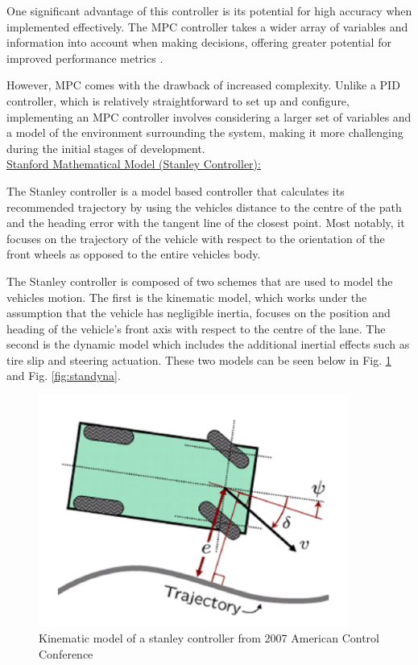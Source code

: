 \documentclass[titlepage,draft]{article}
\begin{document}
{One significant advantage of this controller is its potential for high accuracy when implemented effectively. The MPC controller takes a wider array of variables and information into account when making decisions, offering greater potential for improved performance metrics \cite{GARCIA1989335}.

However, MPC comes with the drawback of increased complexity. Unlike a PID controller, which is relatively straightforward to set up and configure, implementing an MPC controller involves considering a larger set of variables and a model of the environment surrounding the system, making it more challenging during the initial stages of development.
\\

\underline{Stanford Mathematical Model (Stanley Controller):}

The Stanley controller is a model based controller that calculates its recommended trajectory by using the vehicles distance to the centre of the path and the heading error with the tangent line of the closest point. Most notably, it focuses on the trajectory of the vehicle with respect to the orientation of the front wheels as opposed to the entire vehicles body\cite{4282788}.

The Stanley controller is composed of two schemes that are used to model the vehicles motion. The first is the kinematic model, which works under the assumption that the vehicle has negligible inertia, focuses on the position and heading of the vehicle's front axis with respect to the centre of the lane. The second is the dynamic model which includes the additional inertial effects such as tire slip and steering actuation. These two models can be seen below in Fig. \ref{fig:stankine} and Fig. \ref{fig:standyna}.

\begin{figure}
	\centering
	\includegraphics[width=4in]{stanley_kinematic}
	\caption{Kinematic model of a stanley controller from 2007 American Control Conference \cite{4282788}}
	\label{fig:stankine}
\end{figure}

}
\end{document}
